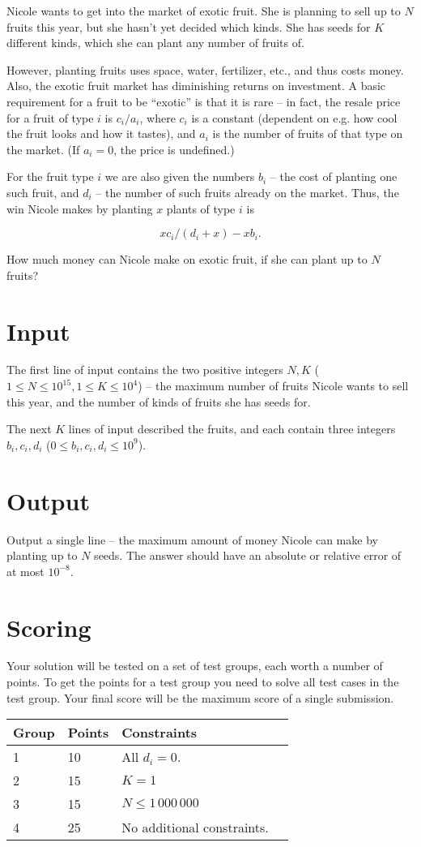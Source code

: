 Nicole wants to get into the market of exotic fruit.
She is planning to sell up to $N$ fruits this year, but she hasn't yet decided which kinds.
She has seeds for $K$ different kinds, which she can plant any number of fruits of.

However, planting fruits uses space, water, fertilizer, etc., and thus costs money.
Also, the exotic fruit market has diminishing returns on investment.
A basic requirement for a fruit to be ``exotic'' is that it is rare -- in fact, the
resale price for a fruit of type $i$ is $c_i / a_i$, where $c_i$ is a constant
(dependent on e.g. how cool the fruit looks and how it tastes), and $a_i$ is the number
of fruits of that type on the market. (If $a_i = 0$, the price is undefined.)

For the fruit type $i$ we are also given the numbers $b_i$ -- the cost of planting one
such fruit, and $d_i$ -- the number of such fruits already on the market.
Thus, the win Nicole makes by planting $x$ plants of type $i$ is

\[ x c_i / (d_i + x) - x b_i. \]

How much money can Nicole make on exotic fruit, if she can plant up to $N$ fruits?

\section*{Input}
The first line of input contains the two positive integers $N, K$ ($1 \le N \le 10^{15}, 1 \le K \le 10^4$) -- the maximum number of fruits
Nicole wants to sell this year, and the number of kinds of fruits she has seeds for.

The next $K$ lines of input described the fruits, and each contain three integers $b_i, c_i, d_i$ ($0 \le b_i, c_i, d_i \le 10^9$).

\section*{Output}
Output a single line -- the maximum amount of money Nicole can make by planting up to $N$ seeds.
The answer should have an absolute or relative error of at most $10^{-8}$.

\section*{Scoring}
Your solution will be tested on a set of test groups, each worth a number of points.
To get the points for a test group you need to solve all test cases in the test group.
Your final score will be the maximum score of a single submission.

\noindent
\begin{tabular}{| l | l | l | l |}
\hline
Group & Points & Constraints \\ \hline
1     & 10     & All $d_i = 0$. \\ \hline
2     & 15     & $K = 1$ \\ \hline
3     & 15     & $N \le 1\,000\,000$ \\ \hline
4     & 25     & No additional constraints. \\ \hline
\end{tabular}

